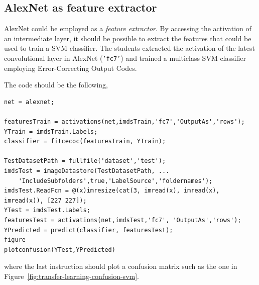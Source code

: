 \documentclass[a4paper, 11pt]{article} %
\begin{document}
\clearpage


\subsection{AlexNet as feature extractor}\label{sec:transfer-learning-2}

AlexNet could be employed as a \emph{feature extractor}. By accessing the activation of an intermediate layer, it should be possible to extract the features that could be used to train a SVM classifier. The students extracted the activation of the latest convolutional layer in AlexNet (\texttt{'fc7'}) and trained a multiclass SVM classifier employing Error-Correcting Output Codes.

The code should be the following,

\begin{lstlisting}
net = alexnet;

featuresTrain = activations(net,imdsTrain,'fc7','OutputAs','rows');
YTrain = imdsTrain.Labels;
classifier = fitcecoc(featuresTrain, YTrain);

TestDatasetPath = fullfile('dataset','test');
imdsTest = imageDatastore(TestDatasetPath, ...
    'IncludeSubfolders',true,'LabelSource','foldernames');
imdsTest.ReadFcn = @(x)imresize(cat(3, imread(x), imread(x), imread(x)), [227 227]);
YTest = imdsTest.Labels;
featuresTest = activations(net,imdsTest,'fc7', 'OutputAs','rows');
YPredicted = predict(classifier, featuresTest);
figure
plotconfusion(YTest,YPredicted)
\end{lstlisting}

where the last instruction should plot a confusion matrix such as the one in Figure~\ref{fig:transfer-learning-confusion-svm}.
\end{document}

